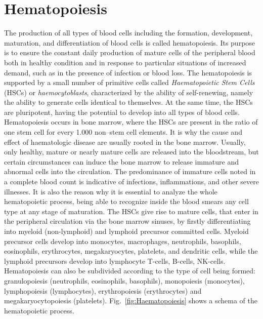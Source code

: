 \documentclass[final,a4paper,12pt,english]{UnicaPhdThesis3}
\begin{document}
{\chapter{Hematopoiesis}\label{appendixA}
The production of all types of blood cells including the formation, development, maturation, and differentiation of blood cells is called hematopoiesis. Its purpose is to ensure the constant daily production of mature cells of the peripheral blood both in healthy condition and in response to particular situations of increased demand, such as in the presence of infection or blood loss. The hematopoiesis is supported by a small number of primitive cells called \textit{Haematopoietic Stem Cells} (\acs{HSC}s) or \textit{haemocytoblasts}, characterized by the ability of self-renewing, namely the ability to generate cells identical to themselves. At the same time, the HSCs are pluripotent, having the potential to develop into all types of blood cells. Hematopoiesis occurs in bone marrow, where the HSCs are present in the ratio of one stem cell for every 1.000 non–stem cell elements. It is why the cause and effect of haematologic disease are usually rooted in the bone marrow. Usually, only healthy, mature or nearly mature cells are released into the bloodstream, but certain circumstances can induce the bone marrow to release immature and abnormal cells into the circulation. The predominance of immature cells noted in a complete blood count is indicative of infections, inflammations, and other severe illnesses. It is also the reason why it is essential to analyze the whole hematopoietic process, being able to recognize inside the blood smears any cell type at any stage of maturation. The HSCs give rise to mature cells, that enter in the peripheral circulation via the bone marrow sinuses, by firstly differentiating into myeloid (non-lymphoid) and lymphoid precursor committed cells. Myeloid precursor cells develop into monocytes, macrophages, neutrophils, basophils, eosinophils, erythrocytes, megakaryocytes, platelets, and dendritic cells, while the lymphoid precursors develop into lymphocyte T-cells, B-cells, NK-cells. Hematopoiesis can also be subdivided according to the type of cell being formed: granulopoiesis (neutrophils, eosinophils, basophils), monopoiesis (monocytes), lymphopoiesis (lymphocytes), erythropoiesis (erythrocytes) and megakaryocytopoiesis (platelets). Fig.~\ref{fig:Haematopoiesis} shows a schema of the hematopoietic process.

}
\end{document}
